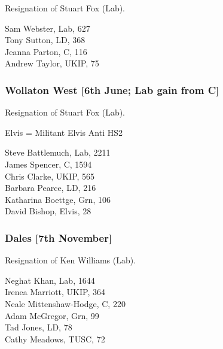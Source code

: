 \documentclass[a4paper,openany,10pt]{book}
\begin{document}

Resignation of Stuart Fox (Lab).



Sam Webster, Lab, 627\\
Tony Sutton, LD, 368\\
Jeanna Parton, C, 116\\
Andrew Taylor, UKIP, 75\\


\subsubsection*{Wollaton West \hspace*{\fill}\nolinebreak[1]%
\enspace\hspace*{\fill}
[6th June; Lab gain from C]}


Resignation of Stuart Fox (Lab).

Elvis = Militant Elvis Anti HS2



Steve Battlemuch, Lab, 2211\\
James Spencer, C, 1594\\
Chris Clarke, UKIP, 565\\
Barbara Pearce, LD, 216\\
Katharina Boettge, Grn, 106\\
David Bishop, Elvis, 28\\


\subsubsection*{Dales \hspace*{\fill}\nolinebreak[1]%
\enspace\hspace*{\fill}
[7th November]}


Resignation of Ken Williams (Lab).



Neghat Khan, Lab, 1644\\
Irenea Marriott, UKIP, 364\\
{Neale Mittenshaw-Hodge}, C, 220\\
Adam McGregor, Grn, 99\\
Tad Jones, LD, 78\\
Cathy Meadows, TUSC, 72\\
\end{document}
